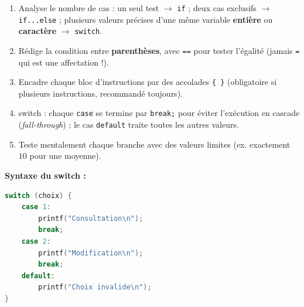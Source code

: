 \documentclass[11pt]{article}
\newcommand{\cle}[1]{{\popxbold\color{popdark}#1}}
\begin{document}
\begin{methode}
\begin{enumerate}
\item \cle{Analyse} le nombre de cas : un seul test $\to$ \texttt{if} ; deux cas exclusifs $\to$ \texttt{if...else} ; plusieurs valeurs précises d'une même variable \textbf{entière} ou \textbf{caractère} $\to$ \texttt{switch}.
\item \cle{Rédige} la condition entre \textbf{parenthèses}, avec \texttt{==} pour tester l'égalité (jamais \texttt{=} qui est une affectation !).
\item \cle{Encadre} chaque bloc d'instructions par des accolades \texttt{\{ \}} (obligatoire si plusieurs instructions, recommandé toujours).
\item \cle{switch} : chaque \texttt{case} se termine par \texttt{break;} pour éviter l'exécution en cascade (\emph{fall-through}) ; le cas \texttt{default} traite toutes les autres valeurs.
\item \cle{Teste} mentalement chaque branche avec des valeurs limites (ex. exactement $10$ pour une moyenne).
\end{enumerate}
\textbf{Syntaxe du switch :}
\begin{lstlisting}[language=C]
switch (choix) {
    case 1:
        printf("Consultation\n");
        break;
    case 2:
        printf("Modification\n");
        break;
    default:
        printf("Choix invalide\n");
}
\end{lstlisting}
\end{methode}
\end{document}
